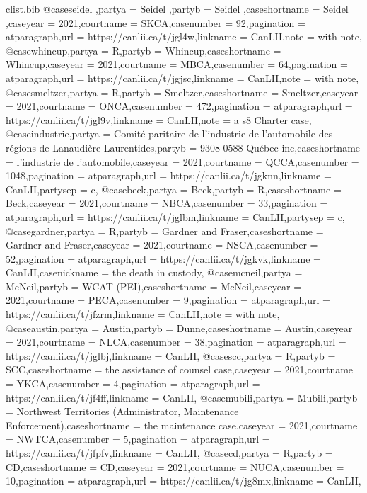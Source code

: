 \begin{filecontents*}[overwrite]{clist\jobname.bib}
@case{seidel ,partya =  {Seidel },partyb =  {Seidel },caseshortname =  {Seidel },caseyear =  {2021},courtname =  {SKCA},casenumber =  {92},pagination =  {atparagraph},url =  {https://canlii.ca/t/jgl4w},linkname =  {CanLII},note =  {with note},}
@case{whincup,partya =  {R},partyb =  {Whincup},caseshortname =  {Whincup},caseyear =  {2021},courtname =  {MBCA},casenumber =  {64},pagination =  {atparagraph},url =  {https://canlii.ca/t/jgjsc},linkname =  {CanLII},note =  {with note},}
@case{smeltzer,partya =  {R},partyb =  {Smeltzer},caseshortname =  {Smeltzer},caseyear =  {2021},courtname =  {ONCA},casenumber =  {472},pagination =  {atparagraph},url =  {https://canlii.ca/t/jgl9v},linkname =  {CanLII},note =  {a s8 Charter case},}
@case{industrie,partya =  {Comité paritaire de l'industrie de l'automobile des régions de Lanaudière-Laurentides},partyb =  {9308-0588 Québec inc},caseshortname =  {l'industrie de l'automobile},caseyear =  {2021},courtname =  {QCCA},casenumber =  {1048},pagination =  {atparagraph},url =  {https://canlii.ca/t/jgknn},linkname =  {CanLII},partysep =  {c},}
@case{beck,partya =  {Beck},partyb =  {R},caseshortname =  {Beck},caseyear =  {2021},courtname =  {NBCA},casenumber =  {33},pagination =  {atparagraph},url =  {https://canlii.ca/t/jglbm},linkname =  {CanLII},partysep =  {c},}
@case{gardner,partya =  {R},partyb =  {Gardner and Fraser},caseshortname =  {Gardner and Fraser},caseyear =  {2021},courtname =  {NSCA},casenumber =  {52},pagination =  {atparagraph},url =  {https://canlii.ca/t/jgkvk},linkname =  {CanLII},casenickname =  {the death in custody},}
@case{mcneil,partya =  {McNeil},partyb =  {WCAT (PEI)},caseshortname =  {McNeil},caseyear =  {2021},courtname =  {PECA},casenumber =  {9},pagination =  {atparagraph},url =  {https://canlii.ca/t/jfzrm},linkname =  {CanLII},note =  {with note},}
@case{austin,partya =  {Austin},partyb =  {Dunne},caseshortname =  {Austin},caseyear =  {2021},courtname =  {NLCA},casenumber =  {38},pagination =  {atparagraph},url =  {https://canlii.ca/t/jglbj},linkname =  {CanLII},}
@case{scc,partya =  {R},partyb =  {SCC},caseshortname =  {the assistance of counsel case},caseyear =  {2021},courtname =  {YKCA},casenumber =  {4},pagination =  {atparagraph},url =  {https://canlii.ca/t/jf4ff},linkname =  {CanLII},}
@case{mubili,partya =  {Mubili},partyb =  {Northwest Territories (Administrator, Maintenance Enforcement)},caseshortname =  {the maintenance case},caseyear =  {2021},courtname =  {NWTCA},casenumber =  {5},pagination =  {atparagraph},url =  {https://canlii.ca/t/jfpfv},linkname =  {CanLII},}
@case{cd,partya =  {R},partyb =  {CD},caseshortname =  {CD},caseyear =  {2021},courtname =  {NUCA},casenumber =  {10},pagination =  {atparagraph},url =  {https://canlii.ca/t/jg8mx},linkname =  {CanLII},}




\end{filecontents*}
